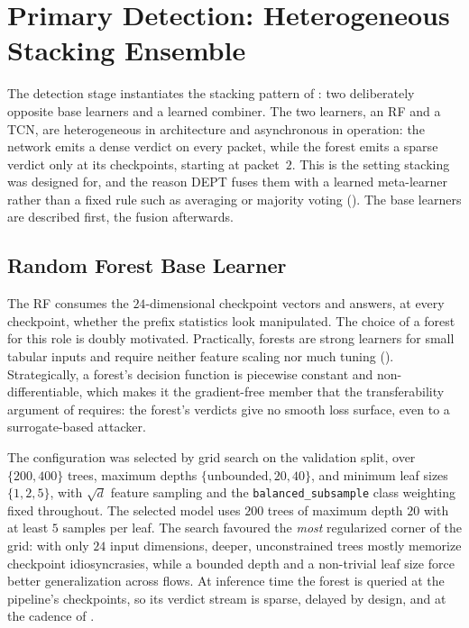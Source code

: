 \section{Primary Detection: Heterogeneous Stacking Ensemble}\label{sec:sol-ensemble}
The detection stage instantiates the stacking pattern of : two
deliberately opposite base learners and a learned combiner. The two learners, an \ac{RF}
and a \ac{TCN}, are heterogeneous in architecture and asynchronous in operation: the
network emits a dense verdict on every packet, while the forest emits a sparse verdict
only at its checkpoints, starting at packet~$2$. This is the setting stacking was
designed for, and the reason DEPT fuses them with a learned meta-learner rather than a
fixed rule such as averaging or majority voting (). The
base learners are described first, the fusion afterwards.

\subsection{Random Forest Base Learner}\label{subsec:sol-rf}
The \ac{RF} consumes the $24$-dimensional checkpoint vectors and answers, at every
checkpoint, whether the prefix statistics look manipulated. The choice of a forest for
this role is doubly motivated. Practically, forests are strong learners for small
tabular inputs and require neither feature scaling nor much tuning
(). Strategically, a forest's decision function is
piecewise constant and non-differentiable, which makes it the gradient-free member that
the transferability argument of  requires: the forest's
verdicts give no smooth loss surface, even to a surrogate-based attacker.

The configuration was selected by grid search on the validation split, over
$\{200, 400\}$ trees, maximum depths $\{\text{unbounded}, 20, 40\}$, and minimum leaf
sizes $\{1, 2, 5\}$, with $\sqrt{d}$ feature sampling and the \texttt{balanced\_subsample}
class weighting fixed throughout. The selected model uses $200$ trees of maximum depth
$20$ with at least $5$ samples per leaf. The search favoured the \emph{most} regularized
corner of the grid: with only $24$ input dimensions,
deeper, unconstrained trees mostly memorize checkpoint idiosyncrasies, while a bounded
depth and a non-trivial leaf size force better generalization across flows. At
inference time the forest is queried at the pipeline's checkpoints, so its
verdict stream is sparse, delayed by design, and at the cadence of
.

